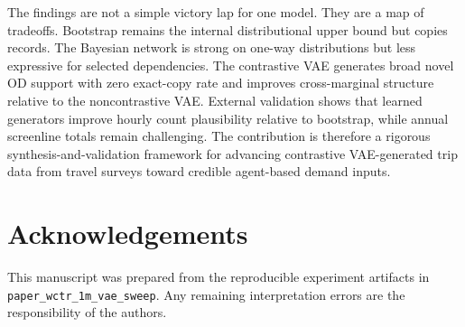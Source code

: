 \documentclass[3p,times,procedia]{elsarticle}
\begin{document}
The findings are not a simple victory lap for one model. They are a map of tradeoffs. Bootstrap remains the internal distributional upper bound but copies records. The Bayesian network is strong on one-way distributions but less expressive for selected dependencies. The contrastive VAE generates broad novel OD support with zero exact-copy rate and improves cross-marginal structure relative to the noncontrastive VAE. External validation shows that learned generators improve hourly count plausibility relative to bootstrap, while annual screenline totals remain challenging. The contribution is therefore a rigorous synthesis-and-validation framework for advancing contrastive VAE-generated trip data from travel surveys toward credible agent-based demand inputs.

\section*{Acknowledgements}
This manuscript was prepared from the reproducible experiment artifacts in \texttt{paper\_wctr\_1m\_vae\_sweep}. Any remaining interpretation errors are the responsibility of the authors.



\end{document}
